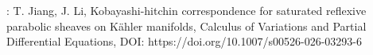 
\begin{achievements}

  \begin{theachievements}[已发表论文]
    \item : T. Jiang, J. Li, Kobayashi-hitchin correspondence for saturated reflexive parabolic sheaves on K{\"a}hler manifolds, Calculus of Variations and Partial Differential Equations, DOI: https://doi.org/10.1007/s00526-026-03293-6
  \end{theachievements}

\end{achievements}
